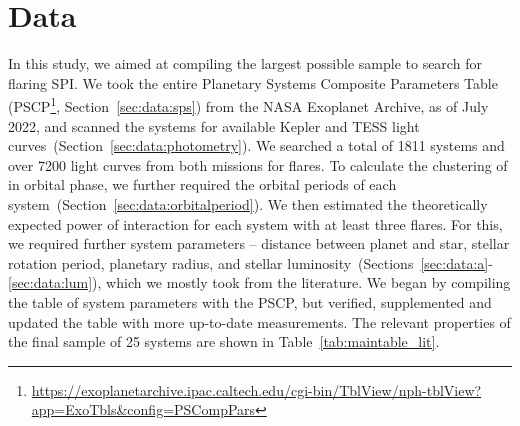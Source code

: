 \documentclass[twocolumn]{aastex631}
\begin{document}







\section{Data}
\label{sec:data}
In this study, we aimed at compiling the largest possible sample to search for flaring SPI. We took the entire Planetary Systems Composite Parameters Table (PSCP\footnote{ \url{https://exoplanetarchive.ipac.caltech.edu/cgi-bin/TblView/nph-tblView?app=ExoTbls&config=PSCompPars}}, Section~\ref{sec:data:sps}) from the NASA Exoplanet Archive, as of July 2022, and scanned the systems for available Kepler and TESS light curves~(Section~\ref{sec:data:photometry}). We searched a total of 1811 systems and over 7200 light curves from both missions for flares. To calculate the clustering of in orbital phase, we further required the orbital periods of each system~(Section~\ref{sec:data:orbitalperiod}). We then estimated the theoretically expected power of interaction for each system with at least three flares. For this, we required further system parameters -- distance between planet and star, stellar rotation period, planetary radius, and stellar luminosity~(Sections~\ref{sec:data:a}-\ref{sec:data:lum}), which we mostly took from the literature. We began by compiling the table of system parameters with the PSCP, but verified, supplemented and updated the table with more up-to-date measurements. The relevant properties of the final sample of 25 systems are shown in Table~\ref{tab:maintable_lit}.
\end{document}
